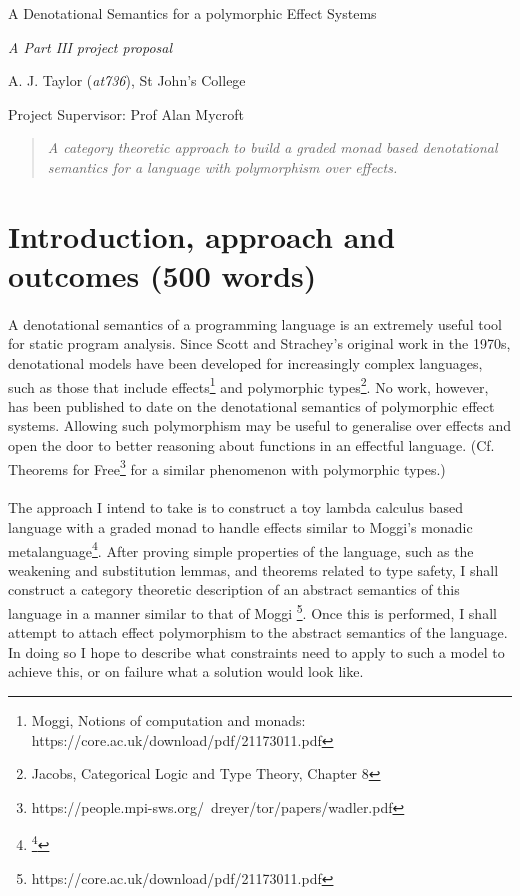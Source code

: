 \documentclass[11pt]{article}
\begin{document}
\centerline{\Large A Denotational Semantics for a polymorphic Effect Systems}
\vspace{2em}
\centerline{\Large \emph{A Part III project proposal}}
\vspace{2em}
\centerline{\large A. J. Taylor (\emph{at736}), St John's College}
\vspace{1em}
\centerline{\large Project Supervisor: Prof Alan Mycroft}
\vspace{1em}

\begin{abstract}
\textsl{
	A category theoretic approach to build a graded monad based denotational semantics for a language with polymorphism over effects.
} 
\end{abstract}

\section{Introduction, approach and outcomes (500 words)}
  
\paragraph{}{
A denotational semantics of a programming language is an extremely useful tool for static program analysis. Since Scott and Strachey's original work in the 1970s, denotational models have been developed for increasingly complex languages, such as those that include effects\footnote{Moggi, Notions of computation and monads: https://core.ac.uk/download/pdf/21173011.pdf} and polymorphic types\footnote{ Jacobs, Categorical Logic and Type Theory, Chapter 8}. No work, however, has been published to date on the denotational semantics of polymorphic effect systems. Allowing such polymorphism may be useful to generalise over effects and open the door to better reasoning about functions in an effectful language. (Cf. Theorems for Free\footnote{https://people.mpi-sws.org/~dreyer/tor/papers/wadler.pdf} for a similar phenomenon with polymorphic types.)
}




\paragraph{}{
The approach I intend to take is to construct a toy lambda calculus based language with a graded monad to handle effects similar to Moggi's monadic metalanguage\footnote{\footnote{Moggi, Notions of computation and monads: https://core.ac.uk/download/pdf/21173011.pdf}}. After proving simple properties of the language, such as the weakening and substitution lemmas, and theorems related to type safety, I shall construct a category theoretic description of an abstract semantics of this language in a manner similar to that of Moggi \footnote{https://core.ac.uk/download/pdf/21173011.pdf}. Once this is performed, I shall attempt to attach effect polymorphism to the abstract semantics of the language. In doing so I hope to describe what constraints need to apply to such a model to achieve this, or on failure what a solution would look like.}
\end{document}
